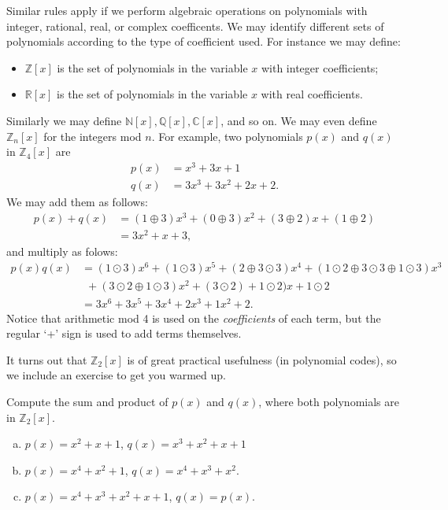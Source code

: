 Similar rules apply if we perform algebraic operations on polynomials with integer, rational, real, or complex coefficents. We may identify different sets of polynomials according to the type of coefficient used. For instance we may define:
\begin{itemize}
\item
$\mathbb{Z}[x]$ is the set of polynomials in the variable $x$ with integer coefficients;
\item
$\mathbb{R}[x]$ is the set of polynomials in the variable $x$ with real coefficients.
\end{itemize}
Similarly we may define $\mathbb{N}[x], \mathbb{Q}[x], \mathbb{C}[x]$, and so on. We may even define $\mathbb{Z}_n[x]$ for the integers mod $n$. For example, two polynomials $p(x)$ and $q(x)$ in $\mathbb{Z}_4[x]$ are
\begin{align*} 
p(x) & = x^3 + 3x +1 \\
q(x) & = 3x^3 + 3x^2 + 2x +2.
\end{align*}
We may add them as follows:
\begin{align*}
p(x) + q(x) &= (1\oplus 3)x^3 + (0\oplus 3)x^2 + (3\oplus 2)x + (1\oplus 2)\\
&= 3x^2 + x + 3,
\end{align*}
and multiply as folows:
\begin{align*}
p(x)  q(x) 
& =  (1 \odot 3)x^6 + (1 \odot 3)x^5 + (2\oplus 3\odot 3)x^4 + (1\odot 2 \oplus 3\odot 3 \oplus  1 \odot 3)x^3 \\
&~~+ (3 \odot 2 \oplus  1 \odot 3)x^2 + (3 \odot 2) + 1 \odot 2)x + 1\odot 2 \\
& = 3x^6 + 3x^5 + 3x^4 + 2x^3 + 1x^2 + 2.
\end{align*}
Notice that arithmetic mod 4 is used on the \emph{coefficients} of each term, but the regular `+' sign is used to add terms themselves.  

It turns out that $\mathbb{Z}_2[x]$ is of great practical usefulness (in polynomial codes), so we include an exercise to get you warmed up.

\begin{exercise}\label{exercise:poly:poly1}
Compute the sum and product of $p(x)$ and $q(x)$, where both polynomials are in $\mathbb{Z}_2[x]$.
\begin{enumerate}[(a)]
\item
$p(x)= x^2 + x + 1$, $q(x)=x^3 +x^2+x+1$
\item
$p(x)= x^4 + x^2+1$, $q(x)=x^4 +x^3+x^2$.
\item
$p(x)= x^4 + x^3+x^2+x+1$, $q(x)=p(x)$.
\end{enumerate}
\end{exercise}

